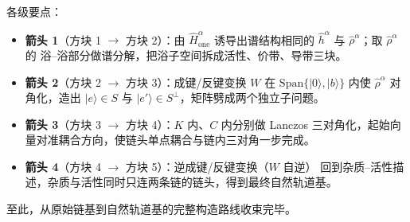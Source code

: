 \documentclass[11pt]{ctexart}
\begin{document}
\begin{center}
\end{center}

\noindent 各级要点：

\begin{itemize}
\item \textbf{箭头 1}（方块 1 $\to$ 方块 2）：由 $\hat H_{\mathrm{one}}^\alpha$
诱导出谱结构相同的 $\hat h^\alpha$ 与 $\hat\rho^\alpha$；取 $\hat\rho^\alpha$ 的
浴--浴部分做谱分解，把浴子空间拆成活性、价带、导带三块。
\item \textbf{箭头 2}（方块 2 $\to$ 方块 3）：成键/反键变换 $W$ 在
$\mathrm{Span}\{|0\rangle,|b\rangle\}$ 内使 $\hat\rho^\alpha$ 对角化，造出
$|e\rangle\in S$ 与 $|e'\rangle\in S^{\perp}$，矩阵劈成两个独立子问题。
\item \textbf{箭头 3}（方块 3 $\to$ 方块 4）：$K$ 内、$C$ 内分别做 Lanczos
三对角化，起始向量对准耦合方向，使链头单点耦合与链内三对角一步完成。
\item \textbf{箭头 4}（方块 4 $\to$ 方块 5）：逆成键/反键变换（$W$ 自逆）
回到杂质--活性描述，杂质与活性同时只连两条链的链头，得到最终自然轨道基。
\end{itemize}

\noindent 至此，从原始链基到自然轨道基的完整构造路线收束完毕。
\end{document}
